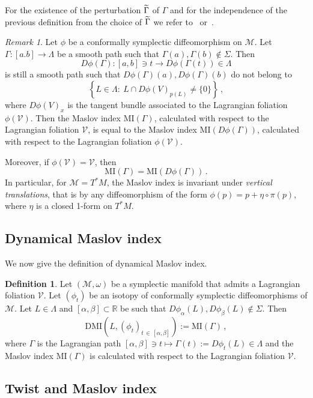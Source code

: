 \documentclass[10pt,a4paper]{amsart}
\numberwithin{equation}{section}
\newcommand*\M{\mathcal{M}}
\newcommand*\cv{\mathcal{V}}
\newcommand{\DMI}{\mathrm{DMI}}
\newcommand{\MI}{\mathrm{MI}}
\newcommand*\R{\mathbb{R}}
\let\oldtilde\tilde
\renewcommand*{\tilde}[1]{\mathchoice{\widetilde{#1}}{\widetilde{#1}}{\oldtilde{#1}}{\oldtilde{#1}}}
\theoremstyle{definition}
\newtheorem{defi}[theo]{Definition}
\theoremstyle{remark}
\newtheorem{rema}[theo]{Remark}
\begin{document}
For the existence of the perturbation $\tilde\Gamma$ of $\Gamma$ and for the independence of the previous definition from the choice of $\tilde\Gamma$ we refer to~\cite{Arn72} or~\cite{Capleem}.


\begin{rema}\label{rmk invariance diffeo cs}
Let $\phi$ be a conformally symplectic diffeomorphism on $\M$. Let $\Gamma:[a.b]\to\Lambda$ be a smooth path such that $\Gamma(a),\Gamma(b)\notin\Sigma$. Then
\[
D\phi(\Gamma):[a,b]\ni t\to D\phi(\Gamma(t))\in\Lambda
\]
is still a smooth path such that $D\phi(\Gamma)(a),D\phi(\Gamma)(b)$ do not belong to
\[
\left\{ L\in\Lambda :\ L\cap D\phi(V)_{p(L)}\neq\{0\}\right\}\,,
\]
where $D\phi(V)_x$ is the tangent bundle associated to the Lagrangian foliation $\phi(\cv)$. Then the Maslov index $\MI(\Gamma)$, calculated with respect to the Lagrangian foliation $\cv$, is equal to the Maslov index $\MI(D\phi(\Gamma))$, calculated with respect to the Lagrangian foliation $\phi(\cv)$.

Moreover, if $\phi(\cv)=\cv$, then
\[
\MI(\Gamma)=\MI(D\phi(\Gamma))\,.
\]
In particular, for $\M=T^*M$, the Maslov index is invariant under \emph{vertical translations}, that is by any diffeomorphism of the form $\phi(p)=p+\eta\circ\pi(p)$, where $\eta$ is a closed 1-form on $T^*M$.
\end{rema}

\subsection{Dynamical Maslov index}

We now give the definition of dynamical Maslov index.

\begin{defi}
Let $(\M,\omega)$ be a symplectic manifold that admits a Lagrangian foliation $\cv$. Let $(\phi_t) $ be an isotopy of conformally symplectic diffeomorphisms of $\M$. Let $L\in\Lambda$ and $[\alpha,\beta]\subset \R$ be such that $D\phi_\alpha(L),D\phi_\beta(L)\notin\Sigma$. Then
\[
\DMI\left(L,(\phi_t)_{t\,\in\,[\alpha,\beta]}\right):= \MI(\Gamma)\,,
\]
where $\Gamma$ is the Lagrangian path $[\alpha,\beta]\ni t\mapsto \Gamma(t):=D\phi_t(L)\in\Lambda$ and the Maslov index $\MI(\Gamma)$ is calculated with respect to the Lagrangian foliation $\cv$.
\end{defi}



\subsection{Twist and Maslov index}
\end{document}
